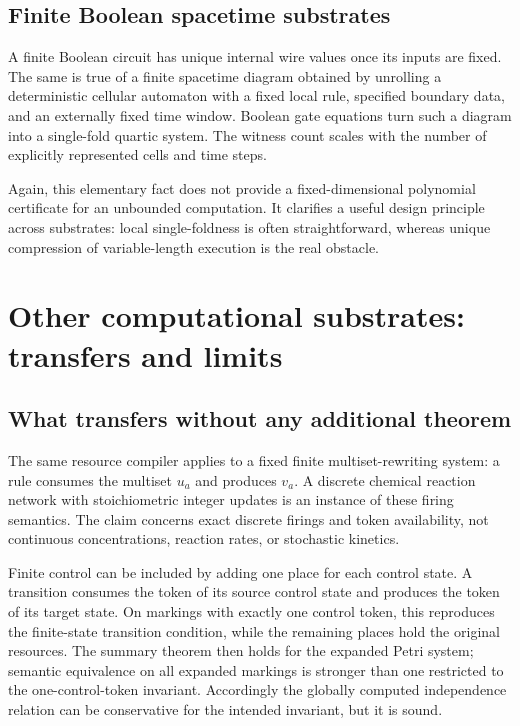 \documentclass[11pt,a4paper]{article}
\theoremstyle{definition}
\theoremstyle{remark}
\newcommand{\srctag}[1]{\texorpdfstring{\hspace{0.5em}{\normalfont\small\color{accent}[#1]}}{ [#1]}}
\begin{document}
\subsection{Finite Boolean spacetime substrates}
A finite Boolean circuit has unique internal wire values once its inputs
are fixed. The same is true of a finite spacetime diagram obtained by
unrolling a deterministic cellular automaton with a fixed local rule,
specified boundary data, and an externally fixed time window. Boolean
gate equations turn such a diagram into a single-fold quartic system.
The witness count scales with the number of explicitly represented cells
and time steps.

Again, this elementary fact does not provide a fixed-dimensional
polynomial certificate for an unbounded computation. It clarifies a
useful design principle across substrates: local single-foldness is often
straightforward, whereas unique compression of variable-length execution
is the real obstacle.


\section{Other computational substrates: transfers and limits\srctag{06}}
\label{cdc:cs:sec:substrates}

\subsection{What transfers without any additional theorem}

The same resource compiler applies to a fixed finite multiset-rewriting
system: a rule consumes the multiset $u_a$ and produces $v_a$. A discrete
chemical reaction network with stoichiometric integer updates is an instance
of these firing semantics. The claim concerns exact discrete firings and
token availability, not continuous concentrations, reaction rates, or
stochastic kinetics.

Finite control can be included by adding one place for each control state.
A transition consumes the token of its source control state and produces the
token of its target state. On markings with exactly one control token, this
reproduces the finite-state transition condition, while the remaining places
hold the original resources. The summary theorem then holds for the expanded
Petri system; semantic equivalence on all expanded markings is stronger than
one restricted to the one-control-token invariant. Accordingly the globally
computed independence relation can be conservative for the intended
invariant, but it is sound.
\end{document}

